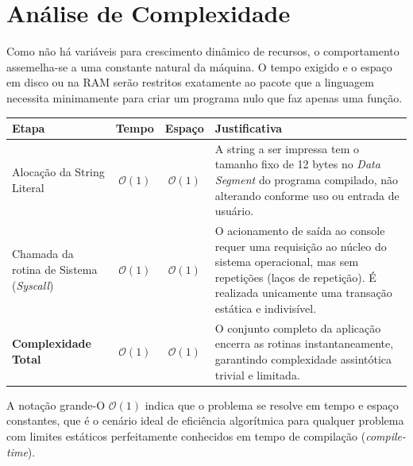 \documentclass{article}
\begin{document}
\vspace{1cm}

\section*{Análise de Complexidade}

Como não há variáveis para crescimento dinâmico de recursos, o comportamento assemelha-se a uma constante natural da máquina. O tempo exigido e o espaço em disco ou na RAM serão restritos exatamente ao pacote que a linguagem necessita minimamente para criar um programa nulo que faz apenas uma função.

\begin{table}[h]
\centering
\begin{tabularx}{\textwidth}{l c c X}
\toprule
\textbf{Etapa} & \textbf{Tempo} & \textbf{Espaço} & \textbf{Justificativa} \\
\midrule
Alocação da String Literal & $\mathcal{O}(1)$ & $\mathcal{O}(1)$ & A string a ser impressa tem o tamanho fixo de 12 bytes no \textit{Data Segment} do programa compilado, não alterando conforme uso ou entrada de usuário. \\
\midrule
Chamada da rotina de Sistema (\textit{Syscall}) & $\mathcal{O}(1)$ & $\mathcal{O}(1)$ & O acionamento de saída ao console requer uma requisição ao núcleo do sistema operacional, mas sem repetições (laços de repetição). É realizada unicamente uma transação estática e indivisível. \\
\midrule
\textbf{Complexidade Total} & $\mathcal{O}(1)$ & $\mathcal{O}(1)$ & O conjunto completo da aplicação encerra as rotinas instantaneamente, garantindo complexidade assintótica trivial e limitada. \\
\bottomrule
\end{tabularx}
\end{table}

A notação grande-O $\mathcal{O}(1)$ indica que o problema se resolve em tempo e espaço constantes, que é o cenário ideal de eficiência algorítmica para qualquer problema com limites estáticos perfeitamente conhecidos em tempo de compilação (\textit{compile-time}).

\vspace{1cm}
\end{document}
